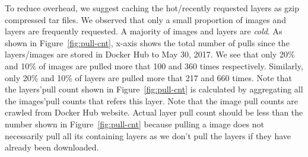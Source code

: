 To reduce overhead, we suggest caching the hot/recently requested layers as
gzip compressed tar files.  We observed that only a small proportion of images
and layers are frequently requested. A majority of images and layers are
\textit{cold}. As shown in Figure~\ref{fig:pull-cnt}, x-axis shows the total
number of pulls since the layers/images are stored in Docker Hub to May 30,
2017.  We see that only 20\% and 10\% of images are pulled more that 100 and
360 times respectively. Similarly, only 20\% and 10\% of layers are pulled more
that 217 and 660 times.  Note that the layers'pull count shown in
Figure~\ref{fig:pull-cnt} is calculated by aggregating all the images'pull
counts that refers this layer. Note that the image pull counts are crawled from
Docker Hub website. Actual layer pull count should be less than the number
shown in Figure~\ref{fig:pull-cnt} because pulling a image does not necessarily
pull all its containing layers as we don't pull the layers if they have already
been downloaded.

%
%

%
%
%

%

